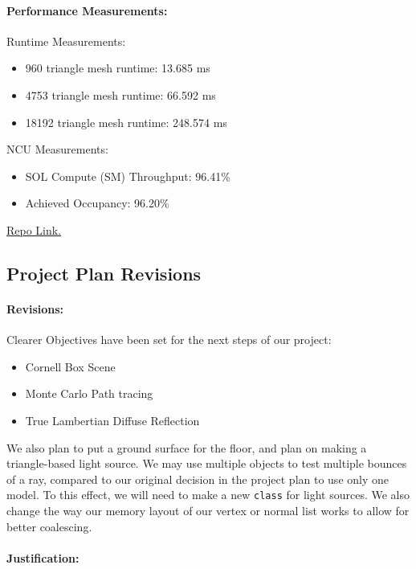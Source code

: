 \documentclass[12pt]{article}
\begin{document}
\paragraph{Performance Measurements:}

Runtime Measurements:
\begin{itemize}
    \item 960 triangle mesh runtime: 13.685 ms
    \item 4753 triangle mesh runtime: 66.592 ms
    \item 18192 triangle mesh runtime: 248.574 ms
\end{itemize}

NCU Measurements:
\begin{itemize}
    \item SOL Compute (SM) Throughput: 96.41\%
    \item Achieved Occupancy: 96.20\%
\end{itemize}

\href{https://github.com/rajsugavanam/CSE4059-final-project}{Repo Link.}

\subsection*{Project Plan Revisions}

\paragraph{Revisions:}

Clearer Objectives have been set for the next steps of our project:

\begin{itemize}
    \item Cornell Box Scene
    \item Monte Carlo Path tracing
    \item True Lambertian Diffuse Reflection
\end{itemize}

We also plan to put a ground surface for the floor, and plan on making a triangle-based light source. We may use
multiple objects to test multiple bounces of a ray, compared to our original decision in the project plan to use only
one model. To this effect, we will need to make a new \texttt{class} for light sources. We also change the way our
memory layout of our vertex or normal list works to allow for better coalescing.

\paragraph{Justification:}
\end{document}
